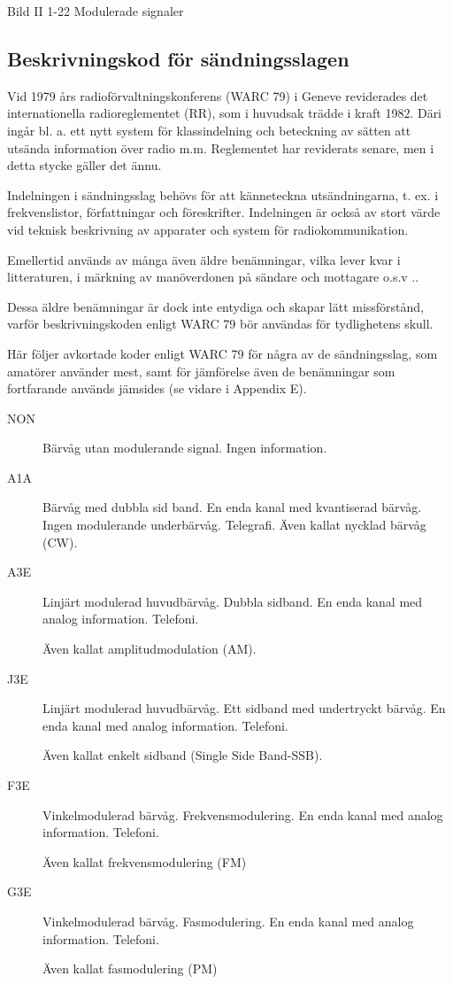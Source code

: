 Bild II 1-22 Modulerade signaler

\subsection{Beskrivningskod för sändningsslagen}

Vid 1979 års radioförvaltningskonferens (WARC 79) i Geneve reviderades det internationella
radioreglementet (RR), som i huvudsak trädde i kraft 1982. Däri ingår bl. a. ett nytt
system för klassindelning och beteckning av sätten att utsända information över
radio m.m. Reglementet har reviderats senare, men i detta stycke gäller det ännu.

Indelningen i sändningsslag behövs för att känneteckna utsändningarna, t. ex. i
frekvenslistor, författningar och föreskrifter. Indelningen är också av stort värde vid
teknisk beskrivning av apparater och system för radiokommunikation.

Emellertid används av många även äldre benämningar, vilka lever kvar i litteraturen, i
märkning av manöverdonen på sändare och mottagare o.s.v ..

Dessa äldre benämningar är dock inte entydiga och skapar lätt missförstånd, varför
beskrivningskoden enligt WARC 79 bör användas för tydlighetens skull.

Här följer avkortade koder enligt WARC 79 för några av de sändningsslag, som amatörer
använder mest, samt för jämförelse även de benämningar som fortfarande används jämsides
(se vidare i Appendix E).

\begin{description}
\item[NON] Bärvåg utan modulerande signal. Ingen information.

\item[A1A] Bärvåg med dubbla sid band. En enda kanal med kvantiserad bärvåg. Ingen
modulerande underbärvåg. Telegrafi. Även kallat nycklad bärvåg (CW).

\item[A3E] Linjärt modulerad huvudbärvåg. Dubbla sidband. En enda kanal med
analog information. Telefoni.

Även kallat amplitudmodulation (AM).

\item[J3E] Linjärt modulerad huvudbärvåg. Ett sidband med undertryckt bärvåg. En
enda kanal med analog information. Telefoni.

Även kallat enkelt sidband (Single Side Band-SSB).

\item[F3E] Vinkelmodulerad bärvåg. Frekvensmodulering. En enda kanal med analog
information. Telefoni.

Även kallat frekvensmodulering (FM)

\item[G3E] Vinkelmodulerad bärvåg. Fasmodulering. En enda kanal med analog information.
Telefoni.

Även kallat fasmodulering (PM)
\end{description}

